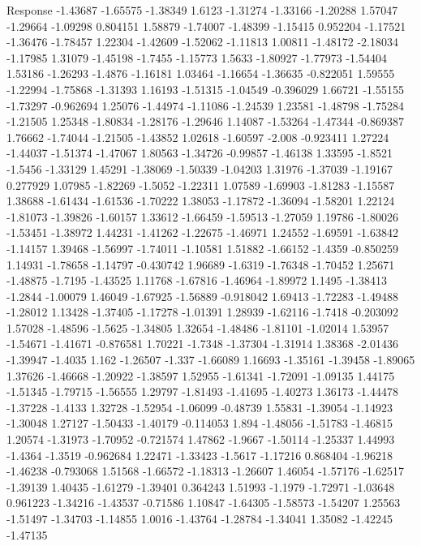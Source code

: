 \documentclass[9pt]{article}
\theoremstyle{plain}
\theoremstyle{definition}
\theoremstyle{remark}
\numberwithin{equation}{section}
\begin{document}
Response
-1.43687
-1.65575
-1.38349
1.6123
-1.31274
-1.33166
-1.20288
1.57047
-1.29664
-1.09298
0.804151
1.58879
-1.74007
-1.48399
-1.15415
0.952204
-1.17521
-1.36476
-1.78457
1.22304
-1.42609
-1.52062
-1.11813
1.00811
-1.48172
-2.18034
-1.17985
1.31079
-1.45198
-1.7455
-1.15773
1.5633
-1.80927
-1.77973
-1.54404
1.53186
-1.26293
-1.4876
-1.16181
1.03464
-1.16654
-1.36635
-0.822051
1.59555
-1.22994
-1.75868
-1.31393
1.16193
-1.51315
-1.04549
-0.396029
1.66721
-1.55155
-1.73297
-0.962694
1.25076
-1.44974
-1.11086
-1.24539
1.23581
-1.48798
-1.75284
-1.21505
1.25348
-1.80834
-1.28176
-1.29646
1.14087
-1.53264
-1.47344
-0.869387
1.76662
-1.74044
-1.21505
-1.43852
1.02618
-1.60597
-2.008
-0.923411
1.27224
-1.44037
-1.51374
-1.47067
1.80563
-1.34726
-0.99857
-1.46138
1.33595
-1.8521
-1.5456
-1.33129
1.45291
-1.38069
-1.50339
-1.04203
1.31976
-1.37039
-1.19167
0.277929
1.07985
-1.82269
-1.5052
-1.22311
1.07589
-1.69903
-1.81283
-1.15587
1.38688
-1.61434
-1.61536
-1.70222
1.38053
-1.17872
-1.36094
-1.58201
1.22124
-1.81073
-1.39826
-1.60157
1.33612
-1.66459
-1.59513
-1.27059
1.19786
-1.80026
-1.53451
-1.38972
1.44231
-1.41262
-1.22675
-1.46971
1.24552
-1.69591
-1.63842
-1.14157
1.39468
-1.56997
-1.74011
-1.10581
1.51882
-1.66152
-1.4359
-0.850259
1.14931
-1.78658
-1.14797
-0.430742
1.96689
-1.6319
-1.76348
-1.70452
1.25671
-1.48875
-1.7195
-1.43525
1.11768
-1.67816
-1.46964
-1.89972
1.1495
-1.38413
-1.2844
-1.00079
1.46049
-1.67925
-1.56889
-0.918042
1.69413
-1.72283
-1.49488
-1.28012
1.13428
-1.37405
-1.17278
-1.01391
1.28939
-1.62116
-1.7418
-0.203092
1.57028
-1.48596
-1.5625
-1.34805
1.32654
-1.48486
-1.81101
-1.02014
1.53957
-1.54671
-1.41671
-0.876581
1.70221
-1.7348
-1.37304
-1.31914
1.38368
-2.01436
-1.39947
-1.4035
1.162
-1.26507
-1.337
-1.66089
1.16693
-1.35161
-1.39458
-1.89065
1.37626
-1.46668
-1.20922
-1.38597
1.52955
-1.61341
-1.72091
-1.09135
1.44175
-1.51345
-1.79715
-1.56555
1.29797
-1.81493
-1.41695
-1.40273
1.36173
-1.44478
-1.37228
-1.4133
1.32728
-1.52954
-1.06099
-0.48739
1.55831
-1.39054
-1.14923
-1.30048
1.27127
-1.50433
-1.40179
-0.114053
1.894
-1.48056
-1.51783
-1.46815
1.20574
-1.31973
-1.70952
-0.721574
1.47862
-1.9667
-1.50114
-1.25337
1.44993
-1.4364
-1.3519
-0.962684
1.22471
-1.33423
-1.5617
-1.17216
0.868404
-1.96218
-1.46238
-0.793068
1.51568
-1.66572
-1.18313
-1.26607
1.46054
-1.57176
-1.62517
-1.39139
1.40435
-1.61279
-1.39401
0.364243
1.51993
-1.1979
-1.72971
-1.03648
0.961223
-1.34216
-1.43537
-0.71586
1.10847
-1.64305
-1.58573
-1.54207
1.25563
-1.51497
-1.34703
-1.14855
1.0016
-1.43764
-1.28784
-1.34041
1.35082
-1.42245
-1.47135
\end{document}
